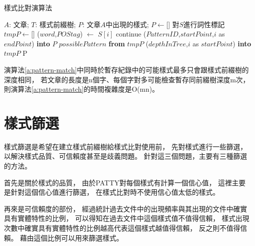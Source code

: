 \begin{algorithm}
    \caption{樣式比對演算法}
    \label{a:pattern-match}
    \begin{algorithmic}[1]
        \Require  
            $A$: 文章;
            $T$: 樣式前綴樹;
        \Ensure
            $P$: 文章$A$中出現的樣式;
        \State $P\gets$[]
            \State 對$S$進行詞性標記
            \State $tmpP\gets$[]
                \State ($word$,$POStag$) $\gets$ $S[i]$
                        \State continue
                    \Else
                             ($PatternID$,$startPoint$,$i$ as $endPoint$) {\bf into} $P$
                        \EndIf
                         $possiblePattern$ {\bf from} $tmpP$
                    \EndIf
                \EndFor
                 ($depthInTree$,$i$ as $startPoint$) {\bf into} $tmpP$
                \EndIf
            \EndFor
        \EndFor
        \State \Return P
    \end{algorithmic}
\end{algorithm}

演算法\ref{a:pattern-match}中同時於暫存紀錄中的可能樣式最多只會跟樣式前綴樹的深度相同，
若文章的長度是n個字、每個字對多可能檢查暫存同前綴樹深度m次，
則演算法\ref{a:pattern-match}的時間複雜度是O(mn)。

\section{樣式篩選}
\label{s:select-pattern}
樣式篩選是希望在建立樣式前綴樹給樣式比對使用前，
先對樣式進行一些篩選，以解決樣式品質、可信賴度甚至是歧義問題。
針對這三個問題，主要有三種篩選的方法。

首先是關於樣式的品質，
由於PATTY對每個樣式有計算一個信心值，
這裡主要是針對這個信心值進行篩選，
在樣式比對時不使用信心值太低的樣式。

再來是可信賴度的部份，
經過統計過去文件中的出現頻率與其出現的文件中確實具有實體特性的比例，
可以得知在過去文件中這個樣式值不值得信賴，
樣式出現次數中確實具有實體特性的比例越高代表這個樣式越值得信賴，
反之則不值得信賴。
藉由這個比例可以用來篩選樣式。


